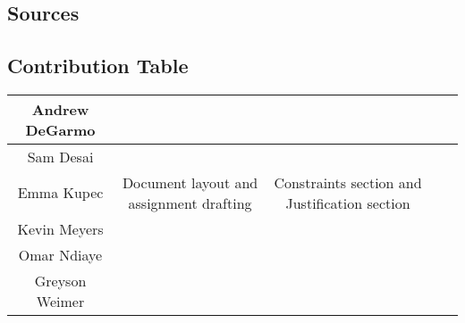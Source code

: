\subsection{Sources}

 

\subsection{Contribution Table}
\begin{center}
    \begin{tabular}{|c|c|c|c|c|} 
        \hline
        Andrew DeGarmo & & & & \\
        \hline
        Sam Desai & & & & \\
        \hline
        Emma Kupec & Document layout and assignment drafting & Constraints section and Justification section & & \\
        \hline
        Kevin Meyers & & & & \\
        \hline
        Omar Ndiaye & & & & \\
        \hline
        Greyson Weimer & & & & \\
        \hline
    \end{tabular}
\end{center}
